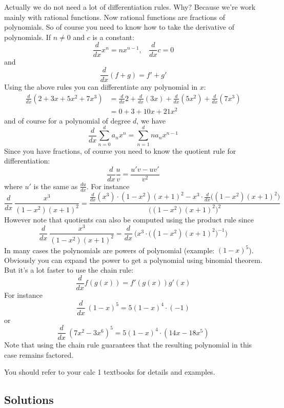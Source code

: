 Actually we do not need a lot of differentiation rules.
Why? 
Because we're work mainly with 
rational functions.
Now rational functions are fractions of polynomials.
So of course you need to know how to take the derivative
of polynomials. If $n \neq 0$ and $c$ is a constant:
\[
\frac{d}{dx} x^n = n x^{n-1}, \,\,\,\,\ \frac{d}{dx} c = 0
\]
and 
\[
\frac{d}{dx} (f + g) = f' + g'
\]
Using the above rules you can differentiate any polynomial in $x$:
\begin{align*}
\frac{d}{dx} (2 + 3x + 5x^2 + 7x^3)
&= \frac{d}{dx} 2 + \frac{d}{dx} (3x) +  \frac{d}{dx}(5x^2) + 
\frac{d}{dx} (7x^3) \\
&= 0 + 3 +  10x + 21x^2
\end{align*}
and of course for a polynomial of degree $d$, we have
\[
\frac{d}{dx} \sum_{n=0}^d a_n x^n = \sum_{n=1}^d na_nx^{n-1}
\]
Since you have fractions, of course you need to know 
the quotient rule for differentiation:
\[
\frac{d}{dx} \frac{u}{v} = 
\frac{u' v - uv'}{v^2}
\]
where $u'$ is the same as $\frac{du}{dx}$.
For instance
\[
\frac{d}{dx} \ \frac{x^3}{(1 - x^2)(x+1)^2}
=
\frac{
\frac{d}{dx}(x^3) \cdot (1 - x^2)(x+1)^2
- x^3 \cdot \frac{d}{dx} \bigl( (1 - x^2)(x+1)^2 \bigr)
}
{\bigl( (1 - x^2)(x+1)^2 \bigr)^2}
\]
However note that quotients can also be computed using
the product rule since
\[
\frac{d}{dx} \ \frac{x^3}{(1 - x^2)(x+1)^2}
=
\frac{d}{dx} \ 
\biggl(
x^3 \cdot \bigl( (1 - x^2)(x+1)^2 \bigr)^{-1}
\biggr)
\]
In many cases the polynomials are powers of polynomial
(example: $(1 - x)^5$). 
Obviously you can expand the power to get a 
polynomial using binomial theorem.
But it's a lot faster to use the chain rule:
\[
\frac{d}{dx} f(g(x)) = f'(g(x)) g'(x)
\]
For instance
\[
\frac{d}{dx} \ (1-x)^5 = 5(1-x)^4 \cdot (-1)
\]
or
\[
\frac{d}{dx} \ (7x^2-3x^6)^5 = 5(1-x)^4 \cdot (14x - 18x^5)
\]
Note that using the chain rule guarantees that the resulting
polynomial in this case remains factored.

You should refer to your calc 1 textbooks for details and examples.

\newpage
\subsection*{Solutions}

